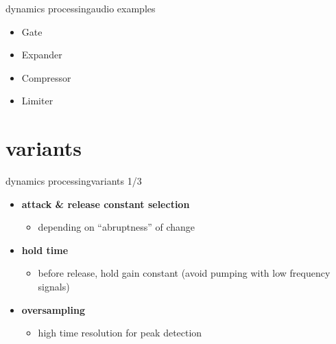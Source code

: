 \begin{frame}{dynamics processing}{audio examples}
    \bigskip
    \begin{itemize}
        \item Gate 
        \item Expander 
        \item Compressor 
        \item Limiter 
    \end{itemize}
\end{frame}

\section{variants}
\begin{frame}{dynamics processing}{variants 1/3}
	\vspace{-3mm}
    \begin{itemize}
		\item	\textbf{attack \& release constant selection}
			\begin{itemize}
				\item	depending on ``abruptness'' of change
			\end{itemize}
		\pause
        \smallskip
		\item	\textbf{hold time}
			\begin{itemize}
				\item	before release, hold gain constant (avoid pumping with low frequency signals)
			\end{itemize}
		\pause
        \smallskip
		\item	\textbf{oversampling}
			\begin{itemize}
				\item	high time resolution for peak detection
			\end{itemize}
	\end{itemize}
\end{frame}

